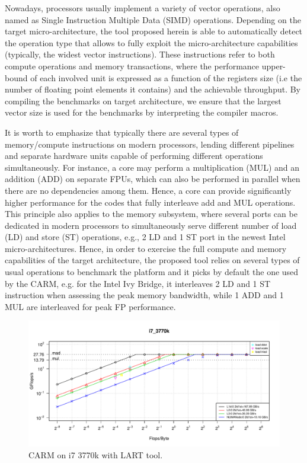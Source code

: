 \documentclass[twoside,twocolumn,8pt]{extarticle}
\begin{document}
Nowadays, processors usually implement a variety of vector operations, also named as Single Instruction Multiple Data (SIMD)
operations. Depending on the target micro-architecture,  the tool proposed herein is able to automatically detect the operation
type that allows to fully exploit the micro-architecture capabilities  (typically, the widest vector instructions). These
instructions refer to both compute operations and memory transactions, where the performance upper-bound of each involved unit is
expressed as a function of the registers size (i.e the number of floating point  elements it contains) and the achievable
throughput. By compiling the benchmarks on target architecture, we ensure that the largest vector size is used for the benchmarks
by interpreting the compiler macros. 

It is worth to emphasize that typically there are several types of memory/compute instructions on modern processors, lending
different pipelines and separate hardware units capable of performing different operations simultaneously. For instance, a core
may perform a multiplication (MUL) and an addition (ADD) on separate FPUs, which  can also be performed in parallel when there are
no  dependencies among them. Hence, a core can provide significantly higher  performance for the codes that fully interleave add
and MUL operations. This principle also applies to the memory subsystem, where several ports can be dedicated in modern processors
to simultaneously serve different number of load (LD) and store (ST) operations, e.g., 2 LD and 1 ST port in the newest Intel
micro-architectures. Hence, in order to exercise the full  compute and memory capabilities of the target architecture, the proposed
tool   relies on several types of usual operations to benchmark the platform and it picks by default the one used by the CARM, e.g.
for the Intel Ivy Bridge, it interleaves 2 LD and 1 ST instruction  when assessing the peak memory bandwidth, while 1 ADD and 1 MUL
are interleaved for peak FP performance. 

\begin{figure}
  \includegraphics[width=\textwidth]{pictures/roofline_model}
  \caption{CARM on i7 3770k with LART tool.}
  \label{fig:LART_adriana}
\end{figure}
\end{document}

